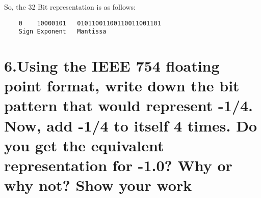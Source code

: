 \documentclass[11pt]{article}
\begin{document}
So, the 32 Bit representation is as follows:
\begin{verbatim}
    0    10000101   01011001100110011001101
    Sign Exponent   Mantissa
\end{verbatim}

\newpage
\section*{6.Using the IEEE 754 floating point format, write down the bit pattern that would represent -1/4. Now, add -1/4 to itself 4 times. Do you get the equivalent representation for -1.0? Why or why not? Show your work}


\end{document}
